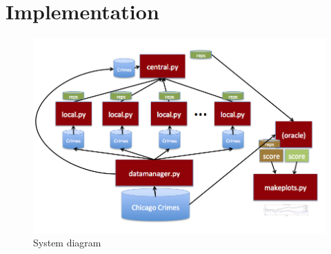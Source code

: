 \section{Implementation}
\label{s:implementation}

\begin{figure}
    \centering
    \includegraphics[width=\linewidth]{system}
    \caption{System diagram}
     \label{fig:implementation}
\end{figure}


